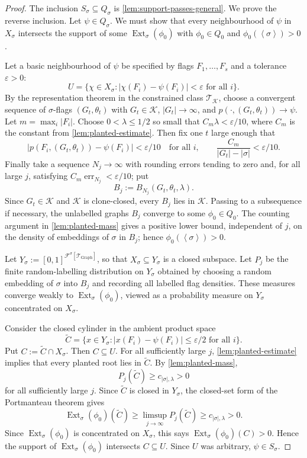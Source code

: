 \documentclass[11pt]{article}
\theoremstyle{definition}
\newcommand{\F}{\mathcal{F}}
\newcommand{\K}{\mathcal{K}}
\newcommand{\T}{\mathcal{T}}
\newcommand{\Ext}{\operatorname{Ext}}
\newcommand{\brak}[1]{\left\langle #1\right\rangle}
\newcommand{\eps}{\varepsilon}
\begin{document}
\begin{proof}
The inclusion $S_\sigma\subseteq Q_\sigma$ is \cref{lem:support-passes-general}.
We prove the reverse inclusion.  Let $\psi\in Q_\sigma$.  We must show that every
neighbourhood of $\psi$ in $X_\sigma$ intersects the support of some
$\Ext_\sigma(\phi_0)$ with $\phi_0\in Q_0$ and $\phi_0(\brak\sigma)>0$.

Let a basic neighbourhood of $\psi$ be specified by flags
$F_1,\ldots,F_s$ and a tolerance $\eps>0$:
\[
  U=
  \{\chi\in X_\sigma:
    |\chi(F_i)-\psi(F_i)|<\eps\text{ for all }i\}.
\]
By the representation theorem in the constrained class $\T_\K$, choose a
convergent sequence of $\sigma$-flags
$(G_t,\theta_t)$ with $G_t\in\K$, $|G_t|\to\infty$, and
$p(\cdot,(G_t,\theta_t))\to\psi$.  Let $m=\max_i |F_i|$.
Choose $0<\lambda\le 1/2$ so small that $C_m\lambda<\eps/10$, where $C_m$ is the
constant from \cref{lem:planted-estimate}.  Then fix one $t$ large enough that
\[
  |p(F_i,(G_t,\theta_t))-\psi(F_i)|<\eps/10
  \quad\text{for all }i,
  \qquad
  \frac{C_m}{|G_t|-|\sigma|}<\eps/10.
\]
Finally take a sequence $N_j\to\infty$ with rounding errors tending to zero and, for all large $j$, satisfying $C_m\operatorname{err}_{N_j}<\eps/10$; put
\[
  B_j:=B_{N_j}(G_t,\theta_t,\lambda).
\]
Since $G_t\in\K$ and $\K$ is clone-closed, every $B_j$ lies in $\K$.  Passing to
a subsequence if necessary, the unlabelled graphs $B_j$ converge to some
$\phi_0\in Q_0$.  The counting argument in \cref{lem:planted-mass} gives a positive lower bound, independent of $j$, on the density of embeddings of $\sigma$ in $B_j$; hence $\phi_0(\brak\sigma)>0$.

Let $Y_\sigma:=[0,1]^{\F^\sigma[\T_{\mathrm{Graph}}]}$, so that
$X_\sigma\subseteq Y_\sigma$ is a closed subspace.  Let $P_j$ be the finite
random-labelling distribution on $Y_\sigma$ obtained by choosing a random embedding
of $\sigma$ into $B_j$ and recording all labelled flag densities.  These measures
converge weakly to $\Ext_\sigma(\phi_0)$, viewed as a probability measure on
$Y_\sigma$ concentrated on $X_\sigma$.

Consider the closed cylinder in the ambient product space
\[
  \widetilde C=
  \{x\in Y_\sigma:
    |x(F_i)-\psi(F_i)|\le\eps/2\text{ for all }i\}.
\]
Put $C:=\widetilde C\cap X_\sigma$.  Then $C\subseteq U$.  For all sufficiently
large $j$, \cref{lem:planted-estimate} implies that every planted root lies
in $\widetilde C$.  By \cref{lem:planted-mass},
\[
  P_j(\widetilde C)\ge c_{|\sigma|,\lambda}>0
\]
for all sufficiently large $j$.  Since $\widetilde C$ is closed in $Y_\sigma$, the
closed-set form of the Portmanteau theorem gives
\[
  \Ext_\sigma(\phi_0)(\widetilde C)
  \ge
  \limsup_{j\to\infty} P_j(\widetilde C)
  \ge c_{|\sigma|,\lambda}>0.
\]
Since $\Ext_\sigma(\phi_0)$ is concentrated on $X_\sigma$, this says
$\Ext_\sigma(\phi_0)(C)>0$.  Hence the support of $\Ext_\sigma(\phi_0)$ intersects
$C\subseteq U$.  Since $U$ was arbitrary, $\psi\in S_\sigma$.
\end{proof}
\end{document}
